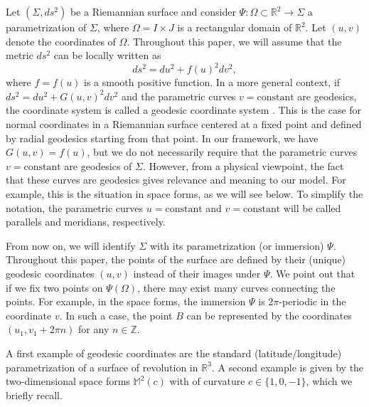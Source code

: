 \documentclass[a4paper,12pt]{amsart}
\theoremstyle{definition}
\def\r{\mathbb R}
\def\m{\mathbb M}
\begin{document}
Let $(\Sigma,ds^2)$ be a Riemannian surface and consider $\Psi\colon\Omega\subset\r^2\to \Sigma$ a parametrization of $\Sigma$, where $\Omega=I\times J$ is a rectangular domain of $\r^2$. Let $(u,v)$ denote the coordinates of $\Omega$. Throughout this paper, we will assume that the metric $ds^2$ can be locally written as 
\begin{equation}\label{ds}
ds^2=du^2+f(u)^2dv^2,
\end{equation}
where $f=f(u)$ is a smooth positive function. In a more general context, if $ds^2=du^2+G(u,v)^2dv^2$ and the parametric curves $v=\textrm{constant}$ 
are geodesics, the     coordinate system is called a geodesic coordinate system \cite[p. 136]{str}. This is the case for normal coordinates in a Riemannian surface centered at a fixed point and defined by radial geodesics starting from that point. In our framework, we have $G(u,v)=f(u)$, but we do not necessarily require  that the parametric curves $v=\text{constant}$ are geodesics of $\Sigma$. However, from a physical viewpoint, the fact that these curves are geodesics gives relevance and meaning to our model. For example, this is the situation in space forms, as we will see below.  To simplify the notation, the parametric curves 
$u=\text{constant}$ and $v=\text{constant}$ will be called parallels and meridians, respectively.

 From now on, we will identify $\Sigma$ with its parametrization (or immersion) $\Psi$. Throughout this paper, the points of the surface are defined by their (unique) geodesic coordinates $(u,v)$ instead of their images under $\Psi$. We point out that if we fix two points on $ \Psi(\Omega)$, there may exist many curves connecting the points. For example, in the space forms, the immersion $\Psi$ is $2\pi$-periodic in the coordinate $v$. In such a case, the point $B$ can be represented by the coordinates $(u_1, v_1 + 2\pi n)$ for any $n \in \mathbb{Z}$. 
 

A first example of geodesic coordinates are the standard (latitude/longitude) parametrization of  a surface of revolution in $\r^3$. A second example is given by  the two-dimensional space forms $\m^2(c)$ with of curvature $c\in\{1,0,-1\}$, which we briefly recall. 
\end{document}
